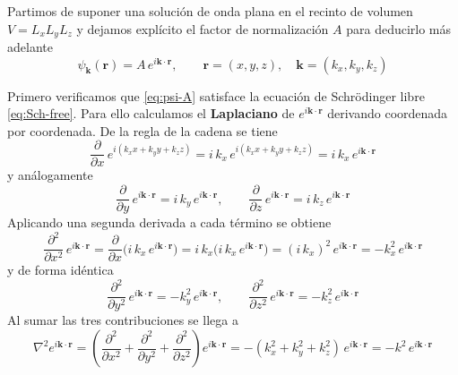 \documentclass{article}
\begin{document}
Partimos de suponer una solución de onda plana en el recinto de volumen $V=L_xL_yL_z$ y dejamos explícito el factor de normalización $A$ para deducirlo más adelante
\begin{equation}\label{eq:psi-A}
\psi_{\mathbf k}(\mathbf r)=A\,e^{i\mathbf k\cdot\mathbf r},
\qquad
\mathbf r=(x,y,z),\quad \mathbf k=(k_x,k_y,k_z)
\end{equation}

Primero verificamos que \eqref{eq:psi-A} satisface la ecuación de Schrödinger libre \eqref{eq:Sch-free}. Para ello calculamos el \textcolor{Cerulean}{\textbf{Laplaciano}} de $e^{i\mathbf k\cdot\mathbf r}$ derivando coordenada por coordenada. De la regla de la cadena se tiene
\begin{equation}\label{eq:deriv-1x}
\frac{\partial}{\partial x}\,e^{i(k_x x+k_y y+k_z z)}
= i\,k_x\,e^{i(k_x x+k_y y+k_z z)}
= i\,k_x\,e^{i\mathbf k\cdot\mathbf r}
\end{equation}
y análogamente
\begin{equation}\label{eq:deriv-1y1z}
\frac{\partial}{\partial y}\,e^{i\mathbf k\cdot\mathbf r}=i\,k_y\,e^{i\mathbf k\cdot\mathbf r},
\qquad
\frac{\partial}{\partial z}\,e^{i\mathbf k\cdot\mathbf r}=i\,k_z\,e^{i\mathbf k\cdot\mathbf r}
\end{equation}
Aplicando una segunda derivada a cada término se obtiene
\begin{equation}\label{eq:deriv-2x}
\frac{\partial^2}{\partial x^2}\,e^{i\mathbf k\cdot\mathbf r}
=\frac{\partial}{\partial x}\Big(i\,k_x\,e^{i\mathbf k\cdot\mathbf r}\Big)
=i\,k_x\Big(i\,k_x\,e^{i\mathbf k\cdot\mathbf r}\Big)
=(i\,k_x)^2\,e^{i\mathbf k\cdot\mathbf r}
=-k_x^2\,e^{i\mathbf k\cdot\mathbf r}
\end{equation}
y de forma idéntica
\begin{equation}\label{eq:deriv-2y2z}
\frac{\partial^2}{\partial y^2}\,e^{i\mathbf k\cdot\mathbf r}=-k_y^2\,e^{i\mathbf k\cdot\mathbf r},
\qquad
\frac{\partial^2}{\partial z^2}\,e^{i\mathbf k\cdot\mathbf r}=-k_z^2\,e^{i\mathbf k\cdot\mathbf r}
\end{equation}
Al sumar las tres contribuciones se llega a
\begin{equation}\label{eq:laplaciano-explicito}
\nabla^2 e^{i\mathbf k\cdot\mathbf r}
=\left(\frac{\partial^2}{\partial x^2}
+\frac{\partial^2}{\partial y^2}
+\frac{\partial^2}{\partial z^2}\right)e^{i\mathbf k\cdot\mathbf r}
=-(k_x^2+k_y^2+k_z^2)\,e^{i\mathbf k\cdot\mathbf r}
=-k^2\,e^{i\mathbf k\cdot\mathbf r}
\end{equation}
\end{document}
